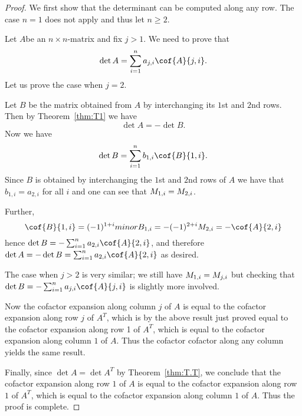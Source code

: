 \begin{proof} We first show that the determinant can be computed along any row. The case $n=1$ does not apply and thus let $n \geq 2$. 


Let $A$be an $n\times n$-matrix and fix $j>1$. We need to prove that
\[
	\det A=\sum_{i=1}^n a_{j,i} \cof{A}{j,i}. 
\]
Let us prove the case when $j=2$. 

Let $B$ be the matrix obtained from $A$ by interchanging its $1$st and $2$nd rows. 
Then by  Theorem~\ref{thm:T1} we have
\[
\det A=-\det B. 
\]
Now we have 
\[
\det B=\sum_{i=1}^n b_{1,i} \cof{B}{1,i}. 
\]
Since $B$ is obtained by interchanging the $1$st and $2$nd rows of $A$
we have that $b_{1,i}=a_{2,i}$ for all $i$
and one can see that $\minor{B}{1,i}=\minor{A}{2,i}$. 

Further, 
\[
\cof{B}{1,i}=(-1)^{1+i} minor B_{1,i}=- (-1)^{2+i} \minor{A}{2,i} = - \cof{A}{2,i}
\]
hence $\det B=-\sum_{i=1}^n a_{2,i} \cof{A}{2,i}$, and therefore 
$\det A=-\det B=
\sum_{i=1}^n a_{2,i} \cof{A}{2,i}$ as desired. 

The case when $j>2$ is very similar; we still have
$\minor{B}{1,i}=\minor{A}{j,i}$ but checking that $\det
B=-\sum_{i=1}^n a_{j,i} \cof{A}{j,i}$ is slightly more
involved.

Now the cofactor expansion along column $j$ of $A$ is equal to the
cofactor expansion along row $j$ of $A^T$, which is by the above
result just proved equal to the cofactor expansion along row 1 of
$A^T$, which is equal to the cofactor expansion along column $1$ of
$A$. Thus the cofactor cofactor along any column yields the same result. 

Finally, since $\det A=\det A^T$ by  Theorem~\ref{thm:T.T}, we conclude that 
the cofactor expansion along row $1$ of $A$ is equal to 
the cofactor expansion along row $1$ of $A^T$, which  is equal to 
the cofactor expansion along column $1$ of $A$. Thus the proof is complete. 
\end{proof} 
